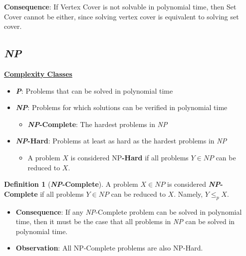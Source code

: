 \documentclass[12pt]{extarticle}
\theoremstyle{definition}
\newtheorem*{definition}{Definition}
\theoremstyle{remark}
\begin{document}
{\noindent\textbf{Consequence}: If Vertex Cover is not solvable in polynomial time, then Set Cover cannot be either, since solving vertex cover is equivalent to solving set cover.

\pagebreak
\subsection{\textit{NP}}
\noindent\ul{\textbf{Complexity Classes}}
\begin{itemize}
    \item \textbf{\textit{P}}: Problems that can be solved in polynomial time
    \item \textbf{\textit{NP}}: Problems for which solutions can be verified in polynomial time \begin{itemize}
        \item \textbf{\textit{NP}-Complete}: The hardest problems in \textit{NP}
    \end{itemize}
    \item \textbf{\textit{NP}-Hard}: Problems at least as hard as the hardest problems in \textit{NP} \begin{itemize}
        \item A problem $X$ is considered NP\textbf{-Hard} if all problems $Y\in NP$ can be reduced to $X$.
    \end{itemize}
\end{itemize}

\vspace{5pt}
\begin{center}
\end{center}

\vspace{5pt}
\begin{definition}[\textbf{\textit{NP}-Complete}]
    A problem $X\in NP$ is considered \textbf{\textit{NP}-Complete} if all problems $Y\in NP$ can be reduced to $X$. Namely, $Y\leq_pX$. \begin{itemize}
        \item \textbf{Consequence}: If any \textit{NP}-Complete problem can be solved in polynomial time, then it must be the case that all problems in \textit{NP} can be solved in polynomial time.
        \item \textbf{Observation}: All NP-Complete problems are also NP-Hard.
    \end{itemize}
\end{definition}

}
\end{document}
